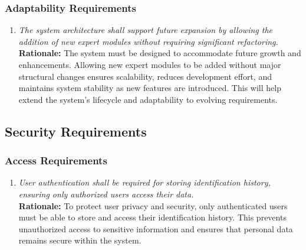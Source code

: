 \documentclass[]{article}
\begin{document}
\subsubsection{Adaptability Requirements}
\label{ssub:adaptability_requirements}
\begin{enumerate}[{MS-A}1. ]
	\item \textit{The system architecture shall support future expansion by allowing the addition of new expert modules without requiring significant refactoring.}
	\\ \textbf{Rationale:} The system must be designed to accommodate future growth and enhancements. Allowing new expert modules to be added without major structural changes ensures scalability, reduces development effort, and maintains system stability as new features are introduced. This will help extend the system’s lifecycle and adaptability to evolving requirements.
\end{enumerate}


\subsection{Security Requirements}
\label{sub:security_requirements}

\subsubsection{Access Requirements}
\label{ssub:access_requirements}
\begin{enumerate}[{SR-AC}1. ]
	\item \textit{User authentication shall be required for storing identification history, ensuring only authorized users access their data.}
	\\ \textbf{Rationale:} To protect user privacy and security, only authenticated users must be able to store and access their identification history. This prevents unauthorized access to sensitive information and ensures that personal data remains secure within the system.
\end{enumerate}
\end{document}
